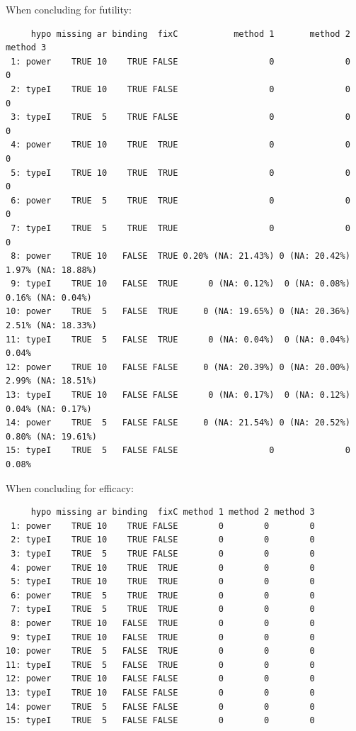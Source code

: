 \documentclass[12pt]{article}
\begin{document}
When concluding for futility:
\begin{verbatim}
     hypo missing ar binding  fixC           method 1       method 2           method 3
 1: power    TRUE 10    TRUE FALSE                  0              0                  0
 2: typeI    TRUE 10    TRUE FALSE                  0              0                  0
 3: typeI    TRUE  5    TRUE FALSE                  0              0                  0
 4: power    TRUE 10    TRUE  TRUE                  0              0                  0
 5: typeI    TRUE 10    TRUE  TRUE                  0              0                  0
 6: power    TRUE  5    TRUE  TRUE                  0              0                  0
 7: typeI    TRUE  5    TRUE  TRUE                  0              0                  0
 8: power    TRUE 10   FALSE  TRUE 0.20% (NA: 21.43%) 0 (NA: 20.42%) 1.97% (NA: 18.88%)
 9: typeI    TRUE 10   FALSE  TRUE      0 (NA: 0.12%)  0 (NA: 0.08%)  0.16% (NA: 0.04%)
10: power    TRUE  5   FALSE  TRUE     0 (NA: 19.65%) 0 (NA: 20.36%) 2.51% (NA: 18.33%)
11: typeI    TRUE  5   FALSE  TRUE      0 (NA: 0.04%)  0 (NA: 0.04%)              0.04%
12: power    TRUE 10   FALSE FALSE     0 (NA: 20.39%) 0 (NA: 20.00%) 2.99% (NA: 18.51%)
13: typeI    TRUE 10   FALSE FALSE      0 (NA: 0.17%)  0 (NA: 0.12%)  0.04% (NA: 0.17%)
14: power    TRUE  5   FALSE FALSE     0 (NA: 21.54%) 0 (NA: 20.52%) 0.80% (NA: 19.61%)
15: typeI    TRUE  5   FALSE FALSE                  0              0              0.08%
\end{verbatim}

When concluding for efficacy:
\begin{verbatim}
     hypo missing ar binding  fixC method 1 method 2 method 3
 1: power    TRUE 10    TRUE FALSE        0        0        0
 2: typeI    TRUE 10    TRUE FALSE        0        0        0
 3: typeI    TRUE  5    TRUE FALSE        0        0        0
 4: power    TRUE 10    TRUE  TRUE        0        0        0
 5: typeI    TRUE 10    TRUE  TRUE        0        0        0
 6: power    TRUE  5    TRUE  TRUE        0        0        0
 7: typeI    TRUE  5    TRUE  TRUE        0        0        0
 8: power    TRUE 10   FALSE  TRUE        0        0        0
 9: typeI    TRUE 10   FALSE  TRUE        0        0        0
10: power    TRUE  5   FALSE  TRUE        0        0        0
11: typeI    TRUE  5   FALSE  TRUE        0        0        0
12: power    TRUE 10   FALSE FALSE        0        0        0
13: typeI    TRUE 10   FALSE FALSE        0        0        0
14: power    TRUE  5   FALSE FALSE        0        0        0
15: typeI    TRUE  5   FALSE FALSE        0        0        0
\end{verbatim}
\end{document}
